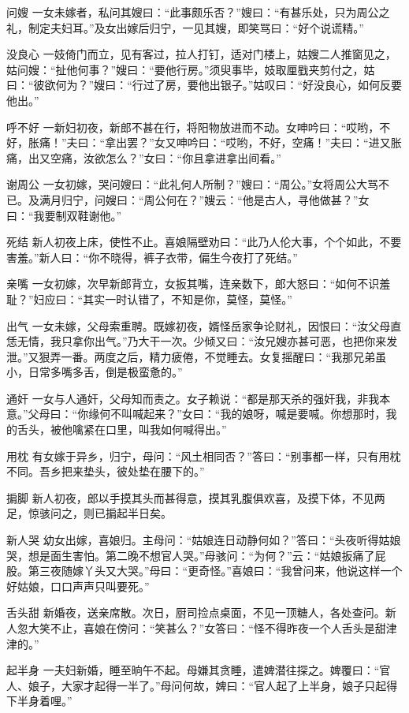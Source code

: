 \documentclass[12pt,UTF8]{ctexbook}
\begin{document}
问嫂
一女未嫁者，私问其嫂曰：“此事颇乐否？”嫂曰：“有甚乐处，只为周公之礼，制定夫妇耳。”及女出嫁后归宁，一见其嫂，即笑骂曰：“好个说谎精。”

没良心
一妓倚门而立，见有客过，拉人打钉，适对门楼上，姑嫂二人推窗见之，姑问嫂：“扯他何事？”嫂曰：“要他行房。”须臾事毕，妓取厘戥夹剪付之，姑曰：“彼欲何为？”嫂曰：“行过了房，要他出银子。”姑叹曰：“好没良心，如何反要他出。”

呼不好
一新妇初夜，新郎不甚在行，将阳物放进而不动。女呻吟曰：“哎哟，不好，胀痛！”夫曰：“拿出罢？”女又呻吟曰：“哎哟，不好，空痛！”夫曰：“进又胀痛，出又空痛，汝欲怎么？”女曰：“你且拿进拿出间看。”

谢周公
一女初嫁，哭问嫂曰：“此礼何人所制？”嫂曰：“周公。”女将周公大骂不已。及满月归宁，问嫂曰：“周公何在？”嫂云：“他是古人，寻他做甚？”女曰：“我要制双鞋谢他。”

死结
新人初夜上床，使性不止。喜娘隔壁劝曰：“此乃人伦大事，个个如此，不要害羞。”新人曰：“你不晓得，裤子衣带，偏生今夜打了死结。”

亲嘴
一女初嫁，次早新郎背立，女扳其嘴，连亲数下，郎大怒曰：“如何不识羞耻？”妇应曰：“其实一时认错了，不知是你，莫怪，莫怪。”

出气
一女未嫁，父母索重聘。既嫁初夜，婿怪岳家争论财礼，因恨曰：“汝父母直恁无情，我只拿你出气。”乃大干一次。少倾又曰：“汝兄嫂亦甚可恶，也把你来发泄。”又狠弄一番。两度之后，精力疲倦，不觉睡去。女复摇醒曰：“我那兄弟虽小，日常多嘴多舌，倒是极蛮惫的。”

通奸
一女与人通奸，父母知而责之。女子赖说：“都是那天杀的强奸我，非我本意。”父母曰：“你缘何不叫喊起来？”女曰：“我的娘呀，喊是要喊。你想那时，我的舌头，被他噙紧在口里，叫我如何喊得出。”

用枕
有女嫁于异乡，归宁，母问：“风土相同否？”答曰：“别事都一样，只有用枕不同。吾乡把来垫头，彼处垫在腰下的。”

掮脚
新人初夜，郎以手摸其头而甚得意，摸其乳腹俱欢喜，及摸下体，不见两足，惊骇问之，则已掮起半日矣。

新人哭
幼女出嫁，喜娘归。主母问：“姑娘连日动静何如？”答曰：“头夜听得姑娘哭，想是面生害怕。第二晚不想官人哭。”母骇问：“为何？”云：“姑娘扳痛了屁股。第三夜随嫁丫头又大哭。”母曰：“更奇怪。”喜娘曰：“我曾问来，他说这样一个好姑娘，口口声声只叫要死。”

舌头甜
新婚夜，送亲席散。次日，厨司捡点桌面，不见一顶糖人，各处查问。新人忽大笑不止，喜娘在傍问：“笑甚么？”女答曰：“怪不得昨夜一个人舌头是甜津津的。”

起半身
一夫妇新婚，睡至晌午不起。母嫌其贪睡，遣婢潜往探之。婢覆曰：“官人、娘子，大家才起得一半了。”母问何故，婢曰：“官人起了上半身，娘子只起得下半身着哩。”
\end{document}
